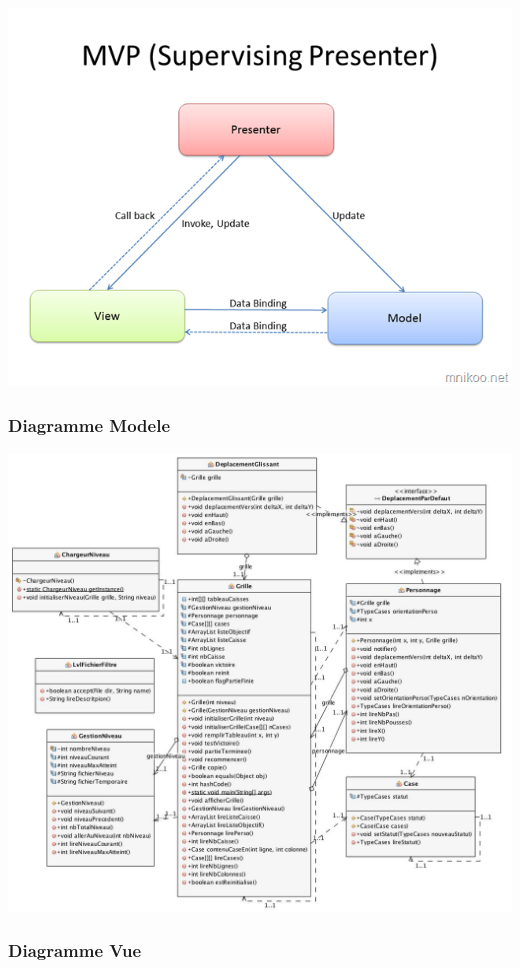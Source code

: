 \documentclass[a4paper,12pt]{article} %
\begin{document}
\includegraphics[scale=1]{mvp.png}
\newpage
\subsubsection{Diagramme Modele}

\includegraphics[scale=0.43]{modele2.jpg}
\newpage
\subsubsection{Diagramme Vue}
\end{document}
